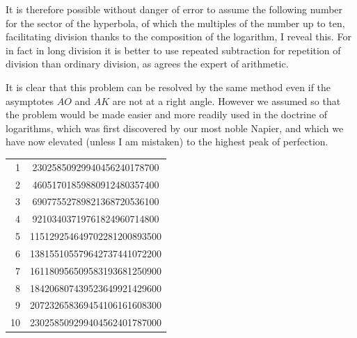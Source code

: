 \documentclass[11pt,letterpaper]{book}
\begin{document}
It is therefore possible without danger of error to assume the following number
for the sector of the hyperbola, of which the multiples of the number up to ten,
facilitating division thanks to the composition of the logarithm, I reveal this.
For in fact in long division it is better to use repeated subtraction for
repetition of division than ordinary division, as agrees the expert of
arithmetic.

It is clear that this problem can be resolved by the same method even if the
asymptotes $AO$ and $AK$ are not at a right angle. However we assumed
so that the problem would be made easier and more readily used in the doctrine
of logarithms, which was first discovered by our most noble Napier, and which we
have now elevated (unless I am mistaken) to the highest peak of perfection.

\begin{center}
\begin{tabular}{ r c }
1  & 23025850929940456240178700 \\
2  & 46051701859880912480357400 \\
3  & 69077552789821368720536100 \\
4  & 92103403719761824960714800 \\
5  & 115129254649702281200893500 \\
6  & 138155105579642737441072200 \\
7  & 161180956509583193681250900 \\
8  & 184206807439523649921429600 \\
9  & 207232658369454106161608300 \\
10 & 230258509299404562401787000 \\ [1.0em]
\end{tabular}
\end{center}


\end{document}

